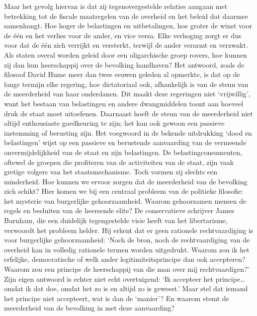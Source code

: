 \documentclass[
  a5paper,
  smalldemyvopaper,10pt,twoside,onecolumn,openright,extrafontsizes,hidelinks]{memoir}
\begin{document}
Maar het gevolg hiervan is dat zij tegenovergestelde relaties aangaan
met betrekking tot de fiscale maatregelen van de overheid en het beleid
dat daarmee samenhangt. Hoe hoger de belastingen en uitbetalingen, hoe
groter de winst voor de één en het verlies voor de ander, en vice versa.
Elke verhoging zorgt er dus voor dat de één zich verrijkt en versterkt,
terwijl de ander verarmt en verzwakt. Als staten overal worden geleid
door een oligarchische groep rovers, hoe kunnen zij dan hun heerschappij
over de bevolking handhaven? Het antwoord, zoals de filosoof David Hume
meer dan twee eeuwen geleden al opmerkte, is dat op de lange termijn
elke regering, hoe dictatoriaal ook, afhankelijk is van de steun van de
meerderheid van haar onderdanen. Dit maakt deze regeringen niet
`vrijwillig', want het bestaan van belastingen en andere dwangmiddelen
toont aan hoeveel druk de staat moet uitoefenen. Daarnaast hoeft de
steun van de meerderheid niet altijd enthousiaste goedkeuring te zijn;
het kan ook gewoon een passieve instemming of berusting zijn. Het
voegwoord in de bekende uitdrukking `dood en belastingen' wijst op een
passieve en berustende aanvaarding van de vermeende onvermijdelijkheid
van de staat en zijn belastingen. De belastingconsumenten, oftewel de
groepen die profiteren van de activiteiten van de staat, zijn vaak
gretige volgers van het staatsmechanisme. Toch vormen zij slechts een
minderheid. Hoe kunnen we ervoor zorgen dat de meerderheid van de
bevolking zich schikt? Hier komen we bij een centraal probleem van de
politieke filosofie: het mysterie van burgerlijke gehoorzaamheid. Waarom
gehoorzamen mensen de regels en besluiten van de heersende elite? De
conservatieve schrijver James Burnham, die een duidelijk tegengestelde
visie heeft van het libertarisme, verwoordt het probleem helder. Hij
erkent dat er geen rationele rechtvaardiging is voor burgerlijke
gehoorzaamheid: `Noch de bron, noch de rechtvaardiging van de overheid
kan in volledig rationele termen worden uitgedrukt. Waarom zou ik het
erfelijke, democratische of welk ander legitimiteitsprincipe dan ook
accepteren? Waarom zou een principe de heerschappij van die man over mij
rechtvaardigen?' Zijn eigen antwoord is echter niet echt overtuigend:
`Ik accepteer het principe\ldots{} omdat ik dat doe, omdat het zo is en
altijd zo is geweest.' Maar stel dat iemand het principe niet
accepteert, wat is dan de `manier'? En waarom stemt de meerderheid van
de bevolking in met deze aanvaarding?
\end{document}
